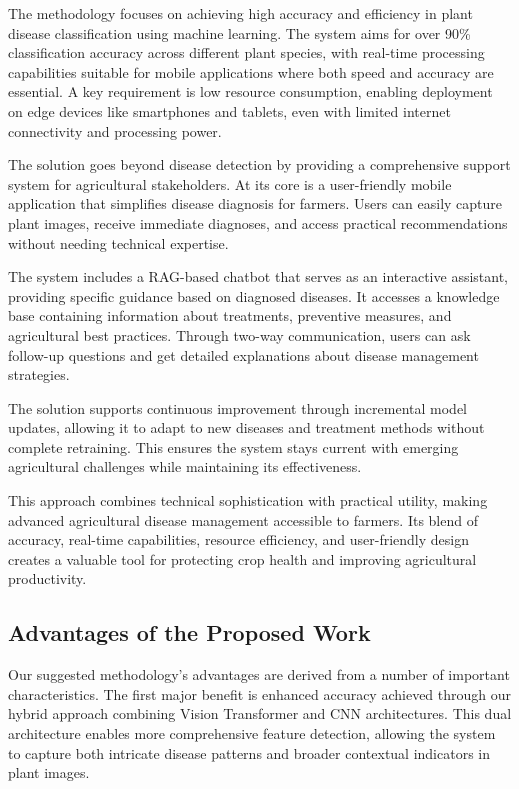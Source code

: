 The methodology focuses on achieving high accuracy and efficiency in plant disease classification using machine learning. The system aims for over 90\% classification accuracy across different plant species, with real-time processing capabilities suitable for mobile applications where both speed and accuracy are essential. A key requirement is low resource consumption, enabling deployment on edge devices like smartphones and tablets, even with limited internet connectivity and processing power.

The solution goes beyond disease detection by providing a comprehensive support system for agricultural stakeholders. At its core is a user-friendly mobile application that simplifies disease diagnosis for farmers. Users can easily capture plant images, receive immediate diagnoses, and access practical recommendations without needing technical expertise.

The system includes a RAG-based chatbot that serves as an interactive assistant, providing specific guidance based on diagnosed diseases. It accesses a knowledge base containing information about treatments, preventive measures, and agricultural best practices. Through two-way communication, users can ask follow-up questions and get detailed explanations about disease management strategies.

The solution supports continuous improvement through incremental model updates, allowing it to adapt to new diseases and treatment methods without complete retraining. This ensures the system stays current with emerging agricultural challenges while maintaining its effectiveness.

This approach combines technical sophistication with practical utility, making advanced agricultural disease management accessible to farmers. Its blend of accuracy, real-time capabilities, resource efficiency, and user-friendly design creates a valuable tool for protecting crop health and improving agricultural productivity.



\subsection{Advantages of the Proposed Work}

Our suggested methodology's advantages are derived from a number of important characteristics.  The first major benefit is enhanced accuracy achieved through our hybrid approach combining Vision Transformer and CNN architectures. This dual architecture enables more comprehensive feature detection, allowing the system to capture both intricate disease patterns and broader contextual indicators in plant images.

